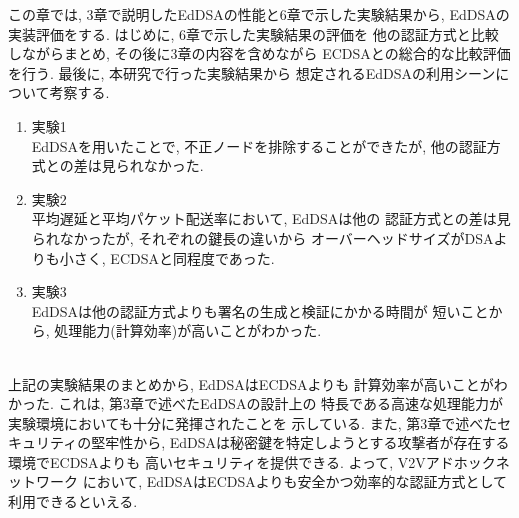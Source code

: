 この章では, 3章で説明したEdDSAの性能と6章で示した実験結果から, 
EdDSAの実装評価をする. はじめに, 6章で示した実験結果の評価を
他の認証方式と比較しながらまとめ, その後に3章の内容を含めながら
ECDSAとの総合的な比較評価を行う. 最後に, 本研究で行った実験結果から
想定されるEdDSAの利用シーンについて考察する.\\[1em]
\begin{enumerate}
  \item 実験1\\
  \indent EdDSAを用いたことで, 不正ノードを排除することができたが, 
  他の認証方式との差は見られなかった. 
  \item 実験2\\
  \indent 平均遅延と平均パケット配送率において, EdDSAは他の
  認証方式との差は見られなかったが, それぞれの鍵長の違いから
  オーバーヘッドサイズがDSAよりも小さく, ECDSAと同程度であった.
  \item 実験3\\
  \indent EdDSAは他の認証方式よりも署名の生成と検証にかかる時間が
  短いことから, 処理能力(計算効率)が高いことがわかった.
\end{enumerate}

\\
\indent 上記の実験結果のまとめから, EdDSAはECDSAよりも
計算効率が高いことがわかった. これは, 第3章で述べたEdDSAの設計上の
特長である高速な処理能力が実験環境においても十分に発揮されたことを
示している. また, 第3章で述べたセキュリティの堅牢性から, 
EdDSAは秘密鍵を特定しようとする攻撃者が存在する環境でECDSAよりも
高いセキュリティを提供できる. よって, V2Vアドホックネットワーク
において, EdDSAはECDSAよりも安全かつ効率的な認証方式として
利用できるといえる.\\

